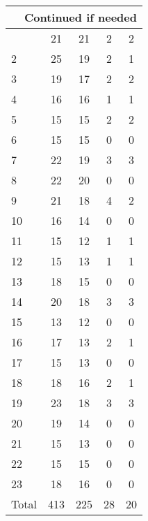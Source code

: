 \begin{center}
\begin{longtable}{l|c|c|c|c}
\hline \multicolumn{5}{|r|}{{Continued if needed}} \\ \hline
\endfoot 
1 & 21 & 21 & 2 & 2\\ \hline
2 & 25 & 19 & 2 & 1\\ \hline
3 & 19 & 17 & 2 & 2\\ \hline
4 & 16 & 16 & 1 & 1\\ \hline
5 & 15 & 15 & 2 & 2\\ \hline
6 & 15 & 15 & 0 & 0\\ \hline
7 & 22 & 19 & 3 & 3\\ \hline
8 & 22 & 20 & 0 & 0\\ \hline
9 & 21 & 18 & 4 & 2\\ \hline
10 & 16 & 14 & 0 & 0\\ \hline
11 & 15 & 12 & 1 & 1\\ \hline
12 & 15 & 13 & 1 & 1\\ \hline
13 & 18 & 15 & 0 & 0\\ \hline
14 & 20 & 18 & 3 & 3\\ \hline
15 & 13 & 12 & 0 & 0\\ \hline
16 & 17 & 13 & 2 & 1\\ \hline
17 & 15 & 13 & 0 & 0\\ \hline
18 & 18 & 16 & 2 & 1\\ \hline
19 & 23 & 18 & 3 & 3\\ \hline
20 & 19 & 14 & 0 & 0\\ \hline
21 & 15 & 13 & 0 & 0\\ \hline
22 & 15 & 15 & 0 & 0\\ \hline
23 & 18 & 16 & 0 & 0\\ \hline
\hline \hline
Total & 413 & 225 & 28 & 20



\end{longtable}
\end{center}

 

